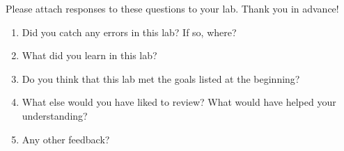 \documentclass[answers]{exam}
\begin{document}
Please attach responses to these questions to your lab. Thank you in advance!

\begin{enumerate}
\item Did you catch any errors in this lab? If so, where?
\item What did you learn in this lab?
\item Do you think that this lab met the goals listed at the beginning? 
\item What else would you have liked to review? What would have helped your understanding?
\item Any other feedback?
\end{enumerate}
\end{document}
